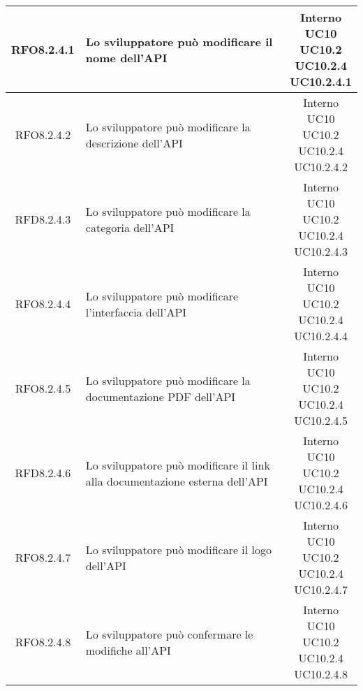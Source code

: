 \begin{longtable}{|c|p{8cm}|c|}
\hypertarget{RFO8.2.4.1}{RFO8.2.4.1} & Lo sviluppatore può modificare il nome dell'API & \makecell*{Interno\\UC10\\UC10.2\\UC10.2.4\\UC10.2.4.1} \\
\hline
\hypertarget{RFO8.2.4.2}{RFO8.2.4.2} & Lo sviluppatore può modificare la descrizione dell'API & \makecell*{Interno\\UC10\\UC10.2\\UC10.2.4\\UC10.2.4.2} \\
\hline
\hypertarget{RFD8.2.4.3}{RFD8.2.4.3} & Lo sviluppatore può modificare la categoria dell'API & \makecell*{Interno\\UC10\\UC10.2\\UC10.2.4\\UC10.2.4.3} \\
\hline
\hypertarget{RFO8.2.4.4}{RFO8.2.4.4} & Lo sviluppatore può modificare l'interfaccia dell'API & \makecell*{Interno\\UC10\\UC10.2\\UC10.2.4\\UC10.2.4.4} \\
\hline
\hypertarget{RFO8.2.4.5}{RFO8.2.4.5} & Lo sviluppatore può modificare la documentazione PDF dell'API & \makecell*{Interno\\UC10\\UC10.2\\UC10.2.4\\UC10.2.4.5} \\
\hline
\hypertarget{RFD8.2.4.6}{RFD8.2.4.6} & Lo sviluppatore può modificare il link alla documentazione esterna dell'API & \makecell*{Interno\\UC10\\UC10.2\\UC10.2.4\\UC10.2.4.6} \\
\hline
\hypertarget{RFO8.2.4.7}{RFO8.2.4.7} & Lo sviluppatore può modificare il logo dell'API & \makecell*{Interno\\UC10\\UC10.2\\UC10.2.4\\UC10.2.4.7} \\
\hline
\hypertarget{RFO8.2.4.8}{RFO8.2.4.8} & Lo sviluppatore può confermare le modifiche all'API & \makecell*{Interno\\UC10\\UC10.2\\UC10.2.4\\UC10.2.4.8} \\
\hline


\end{longtable}

